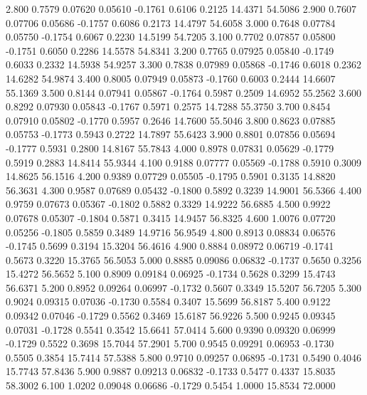    2.800   0.7579   0.07620   0.05610  -0.1761   0.6106   0.2125  14.4371  54.5086
   2.900   0.7607   0.07706   0.05686  -0.1757   0.6086   0.2173  14.4797  54.6058
   3.000   0.7648   0.07784   0.05750  -0.1754   0.6067   0.2230  14.5199  54.7205
   3.100   0.7702   0.07857   0.05800  -0.1751   0.6050   0.2286  14.5578  54.8341
   3.200   0.7765   0.07925   0.05840  -0.1749   0.6033   0.2332  14.5938  54.9257
   3.300   0.7838   0.07989   0.05868  -0.1746   0.6018   0.2362  14.6282  54.9874
   3.400   0.8005   0.07949   0.05873  -0.1760   0.6003   0.2444  14.6607  55.1369
   3.500   0.8144   0.07941   0.05867  -0.1764   0.5987   0.2509  14.6952  55.2562
   3.600   0.8292   0.07930   0.05843  -0.1767   0.5971   0.2575  14.7288  55.3750
   3.700   0.8454   0.07910   0.05802  -0.1770   0.5957   0.2646  14.7600  55.5046
   3.800   0.8623   0.07885   0.05753  -0.1773   0.5943   0.2722  14.7897  55.6423
   3.900   0.8801   0.07856   0.05694  -0.1777   0.5931   0.2800  14.8167  55.7843
   4.000   0.8978   0.07831   0.05629  -0.1779   0.5919   0.2883  14.8414  55.9344
   4.100   0.9188   0.07777   0.05569  -0.1788   0.5910   0.3009  14.8625  56.1516
   4.200   0.9389   0.07729   0.05505  -0.1795   0.5901   0.3135  14.8820  56.3631
   4.300   0.9587   0.07689   0.05432  -0.1800   0.5892   0.3239  14.9001  56.5366
   4.400   0.9759   0.07673   0.05367  -0.1802   0.5882   0.3329  14.9222  56.6885
   4.500   0.9922   0.07678   0.05307  -0.1804   0.5871   0.3415  14.9457  56.8325
   4.600   1.0076   0.07720   0.05256  -0.1805   0.5859   0.3489  14.9716  56.9549
   4.800   0.8913   0.08834   0.06576  -0.1745   0.5699   0.3194  15.3204  56.4616
   4.900   0.8884   0.08972   0.06719  -0.1741   0.5673   0.3220  15.3765  56.5053
   5.000   0.8885   0.09086   0.06832  -0.1737   0.5650   0.3256  15.4272  56.5652
   5.100   0.8909   0.09184   0.06925  -0.1734   0.5628   0.3299  15.4743  56.6371
   5.200   0.8952   0.09264   0.06997  -0.1732   0.5607   0.3349  15.5207  56.7205
   5.300   0.9024   0.09315   0.07036  -0.1730   0.5584   0.3407  15.5699  56.8187
   5.400   0.9122   0.09342   0.07046  -0.1729   0.5562   0.3469  15.6187  56.9226
   5.500   0.9245   0.09345   0.07031  -0.1728   0.5541   0.3542  15.6641  57.0414
   5.600   0.9390   0.09320   0.06999  -0.1729   0.5522   0.3698  15.7044  57.2901
   5.700   0.9545   0.09291   0.06953  -0.1730   0.5505   0.3854  15.7414  57.5388
   5.800   0.9710   0.09257   0.06895  -0.1731   0.5490   0.4046  15.7743  57.8436
   5.900   0.9887   0.09213   0.06832  -0.1733   0.5477   0.4337  15.8035  58.3002
   6.100   1.0202   0.09048   0.06686  -0.1729   0.5454   1.0000  15.8534  72.0000
